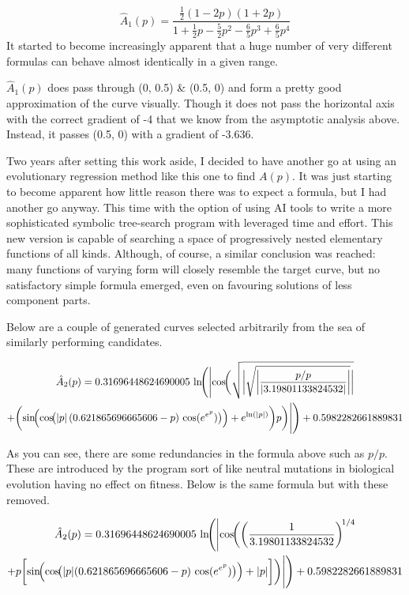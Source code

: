 \documentclass[11pt]{article}
\begin{document}
$$\hat A_1(p) = \frac{\frac{1}{2}(1-2p)(1+2p)}{1 + \frac{1}{2}p - \frac{5}{2}p^2 - \frac{6}{5}p^3 + \frac{6}{5}p^4}$$
It started to become increasingly apparent that a huge number of very different formulas can behave almost identically in a given range. 

$\hat A_1(p)$ does pass through (0, 0.5) \& (0.5, 0) and form a pretty good approximation of the curve visually. Though it does not pass the horizontal axis with the correct gradient of -4 that we know from the asymptotic analysis above. Instead, it passes (0.5, 0) with a gradient of -3.636.

\vspace{10pt}
\noindent
Two years after setting this work aside, I decided to have another go at using an evolutionary regression method like this one to find $A(p)$.
It was just starting to become apparent how little reason there was to expect a formula, but I had another go anyway. This time with the option of using AI tools to write a 
more sophisticated symbolic tree-search program with leveraged time and effort. This new version is capable of searching a space of progressively nested elementary functions of all kinds. Although, of course, a similar
conclusion was reached: many functions of varying form will closely resemble the target curve, but no satisfactory simple formula emerged, even on favouring solutions of less component parts.

Below are a couple of generated curves selected arbitrarily from the sea of similarly performing candidates.

\begin{multline*}
\hat A_2(p) = 0.31696448624690005 \,
\ln\!\Biggl(
\Biggl|
\cos\!\biggl(
\sqrt{
\biggl|
\sqrt{
\biggl|
\frac{p/p}{| 3.19801133824532 |}
\biggr|
}
\biggr|
} \\
+
\biggl(
\sin\!\Bigl(
\cos\!\bigl(
|p| \,
(0.621865696665606 - p)\,
\cos(e^{e^{p}})
\bigr)
\Bigr)
+
e^{\ln(|p|)}
\biggr) p
\biggr)
\Biggr|
\Biggr)
+ 0.5982282661889831
\end{multline*}

\noindent
As you can see, there are some redundancies in the formula above such as $p/p$. These are introduced by the program sort of like neutral mutations in biological evolution having no effect on fitness. Below is the same formula but with these removed.

\begin{multline*}
\hat A_2(p) = 0.31696448624690005 \,
\ln\!\Biggl(
\Biggl|
\cos\!\biggl(
\left( \frac{1}{3.19801133824532} \right)^{\!1/4} \\
+
p \biggl[
\sin\!\Bigl(
\cos\!\bigl(
|p| (0.621865696665606 - p)\,
\cos(e^{e^{p}})
\bigr)
\Bigr)
+
|p|
\biggr]
\biggr)
\Biggr|
\Biggr)
+ 0.5982282661889831
\end{multline*}
\end{document}
